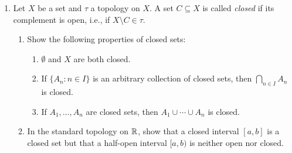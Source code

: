 \begin{exercises}{}{}
\begin{enumerate}
\item Let $X$ be a set and $\tau$ a topology on $X$. A set $C \subseteq X$ is called \emph{closed} if its complement is open, i.e., if $X \setminus C \in \tau$. 
\begin{enumerate}
    \item Show the following properties of closed sets:
    \begin{enumerate}
        \item $\emptyset$ and $X$ are both closed.
        \item If $\{A_n : n \in I\}$ is an arbitrary collection of closed sets, then $\bigcap_{n \in I} A_n$ is closed.
        \item If $A_1,\ldots,A_n$ are closed sets, then $A_1 \cup \cdots \cup A_n$ is closed.
    \end{enumerate}
    \item In the standard topology on $\mathbb{R}$, show that a closed interval $[a,b]$ is a closed set but that a half-open interval $[a,b)$ is neither open nor closed.
\end{enumerate}
\end{enumerate}

\end{exercises}

